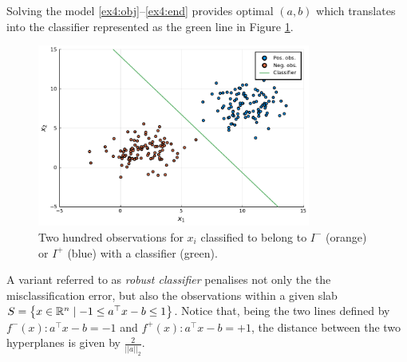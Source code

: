 \documentclass{article}
\begin{document}
Solving the model \eqref{ex4:obj}--\eqref{ex4:end} provides optimal $(a,b)$ which translates into the classifier represented as the green line in Figure \ref{fig:observations_with_classifier}.

\begin{figure}[h]
    \includegraphics[width=0.8\textwidth]{Figures/classes_with_classifier.pdf}
    \caption{Two hundred observations for $x_i$ classified to belong to $I^-$ (orange) or $I^+$ (blue) with a classifier (green).}        
    \label{fig:observations_with_classifier}
\end{figure}
 
A variant referred to as \emph{robust classifier} penalises not only the the misclassification error, but also the observations within a given slab $S = \left\{ x \in \mathbb R^n \mid -1 \leq a^\top x - b \leq 1 \right \}$. Notice that, being the two lines defined by $f^-(x) : a^\top x - b = -1$ and $f^+(x) : a^\top x - b = +1$, the distance between the two hyperplanes is given by $\frac{2}{||a||_2}$. 
\end{document}
